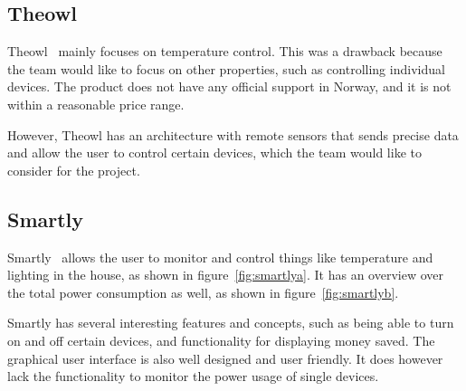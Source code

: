 \subsection{Theowl}

Theowl~\cite{theowl} mainly focuses on temperature control. This was a drawback because the team would like to focus on other properties, such as controlling individual devices. The product does not have any official support in Norway, and it is not within a reasonable price range. 

However, Theowl has an architecture with remote sensors that sends precise data and allow the user to control certain devices, which the team would like to consider for the project.


\subsection{Smartly}

Smartly~\cite{smartly} allows the user to monitor and control things like temperature and lighting in the house, as shown in figure~\ref{fig:smartlya}. It has an overview over the total power consumption as well, as shown in figure~\ref{fig:smartlyb}.

Smartly has several interesting features and concepts, such as being able to turn on and off certain devices, and functionality for displaying money saved. The graphical user interface is also well designed and user friendly. It does however lack the functionality to monitor the power usage of single devices.


